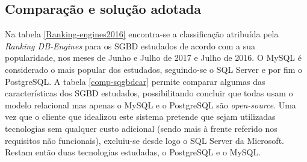 


\subsection{Comparação e solução adotada}




Na tabela \ref{Ranking-engines2016} encontra-se a classificação atribuída pela \textit{Ranking DB-Engines} para os \ac{SGBD} estudados de acordo com a sua popularidade, nos meses de Junho e Julho de 2017 e Julho de 2016\cite{DB-engines2016}. O MySQL é considerado o mais popular dos estudados, seguindo-se o SQL Server e por fim o PostgreSQL. A tabela \ref{comp-sqgbdcar} permite comparar algumas das características dos \ac{SGBD} estudados, possibilitando concluir que todas usam o modelo relacional mas apenas o MySQL e o PostgreSQL são \textit{open-source}. Uma vez que o cliente que idealizou este sistema pretende que sejam utilizadas tecnologias sem qualquer custo adicional (sendo mais à frente referido nos requisitos não funcionais), excluiu-se  desde logo o SQL Server da Microsoft. Restam então duas tecnologias estudadas, o PostgreSQL e o MySQL.


